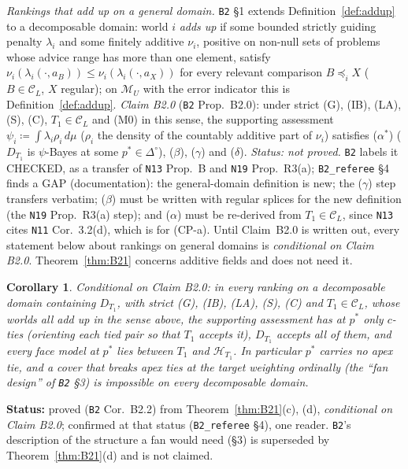 \documentclass[11pt]{article}
\newtheorem{corollary}[theorem]{Corollary}
\theoremstyle{definition}
\theoremstyle{remark}
\newcommand{\Di}{\Delta^{\circ}}
\newcommand{\M}{\mathcal M}
\newcommand{\C}{\mathcal C}
\newcommand{\src}[1]{\texttt{#1}}
\newcommand{\status}[1]{\par\smallskip\noindent\textbf{Status:} #1\par\smallskip}
\begin{document}
\emph{Rankings that add up on a general domain.} \src{B2} \S1 extends Definition~\ref{def:addup} to a decomposable domain: world $i$ \emph{adds up} if some bounded strictly guiding penalty $\lambda_i$ and some finitely additive $\nu_i$, positive on non-null sets of problems whose advice range has more than one element, satisfy $\nu_i(\lambda_i(\cdot,a_B))\le\nu_i(\lambda_i(\cdot,a_X))$ for every relevant comparison $B\preceq_iX$ ($B\in\C_L$, $X$ regular); on $\M_U$ with the error indicator this is Definition~\ref{def:addup}. \emph{Claim B2.0} (\src{B2} Prop.~B2.0): under strict (G), (IB), (LA), (S), (C), $T_1\in\C_L$ and (M0) in this sense, the supporting assessment $\psi_i\coloneqq\int\lambda_i\rho_i\,d\mu$ ($\rho_i$ the density of the countably additive part of $\nu_i$) satisfies ($\alpha^*$) ($D_{T_1}$ is $\psi$-Bayes at some $p^*\in\Di$), ($\beta$), ($\gamma$) and ($\delta$). \emph{Status: not proved.} \src{B2} labels it CHECKED, as a transfer of \src{N13} Prop.~B and \src{N19} Prop.~R3(a); \src{B2\_referee} \S4 finds a GAP (documentation): the general-domain definition is new; the ($\gamma$) step transfers verbatim; ($\beta$) must be written with regular splices for the new definition (the \src{N19} Prop.~R3(a) step); and ($\alpha$) must be re-derived from $T_1\in\C_L$, since \src{N13} cites \src{N11} Cor.~3.2(d), which is for (CP-a). Until Claim~B2.0 is written out, every statement below about rankings on general domains is \emph{conditional on Claim B2.0}. Theorem~\ref{thm:B21} concerns additive fields and does not need it.

\begin{corollary}\label{cor:B22}
Conditional on Claim B2.0: in every ranking on a decomposable domain containing $D_{T_1}$, with strict (G), (IB), (LA), (S), (C) and $T_1\in\C_L$, whose worlds all add up in the sense above, the supporting assessment has at $p^*$ only $c$-ties (orienting each tied pair so that $T_1$ accepts it), $D_{T_1}$ accepts all of them, and every face model at $p^*$ lies between $T_1$ and $\mathcal H_{T_1}$. In particular $p^*$ carries no apex tie, and a cover that breaks apex ties at the target weighting ordinally (the ``fan design'' of \src{B2} \S3) is impossible on every decomposable domain.
\end{corollary}
\status{proved (\src{B2} Cor.~B2.2) from Theorem~\ref{thm:B21}(c), (d), \emph{conditional on Claim B2.0}; confirmed at that status (\src{B2\_referee} \S4), one reader. \src{B2}'s description of the structure a fan would need (\S3) is superseded by Theorem~\ref{thm:B21}(d) and is not claimed.}
\end{document}
